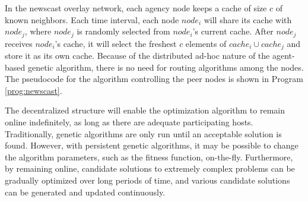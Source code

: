       In the newscast overlay network, each agency node keeps a cache of size $c$ of
        known neighbors. 
      Each time interval, each node $node_i$ will share its cache with
        $node_j$, where $node_j$ is randomly selected from $node_i$’s current
        cache. 
      After $node_j$ receives $node_i$’s cache, it will select the freshest $c$
        elements of $cache_i \cup cache_j$ and store it as its own cache. 
      Because of the distributed ad-hoc nature of the agent-based genetic
        algorithm, there is no need for routing algorithms among the nodes. 
      The pseudocode for the algorithm controlling the peer nodes is shown in 
        Program \ref{prog:newscast}.


      The decentralized structure will enable the optimization algorithm to remain
      online indefinitely, as long as there are adequate participating hosts. Traditionally,
      genetic algorithms are only run until an
      acceptable solution is found. However, with persistent genetic algorithms, it
      may be possible to change the algorithm parameters, such as the fitness
      function, on-the-fly. Furthermore, by remaining online, candidate solutions
      to extremely complex problems can be gradually optimized over long periods of
      time, and various candidate solutions can be generated and updated continuously.



